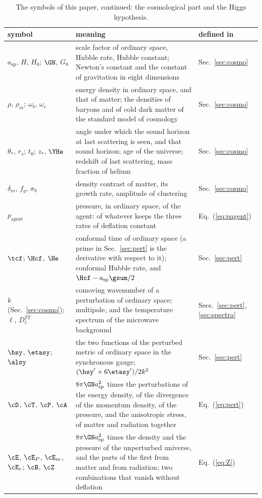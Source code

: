\begin{table}
\caption{\label{tab:symbols3}The symbols of this paper, continued: the cosmological part and the
Higgs hypothesis.}
\begin{ruledtabular}
\begin{tabular}{p{}p{}p{}}
symbol & meaning & defined in \\
\hline
$a_{\mathrm{sp}}$, $H$, $H_0$; $\GN$, $G_8$ & scale factor of ordinary space, Hubble rate, Hubble constant; Newton's constant and the constant of gravitation in eight dimensions & Sec.~\ref{sec:cosmo} \\
$\rho$, $\rho_m$; $\omega_b$, $\omega_c$ & energy density in ordinary space, and that of matter; the densities of baryons and of cold dark matter of the standard model of cosmology & Sec.~\ref{sec:cosmo} \\
$\theta_*$, $r_s$; $t_0$; $z_*$, $\YHe$ & angle under which the sound horizon at last scattering is seen, and that sound horizon; age of the universe; redshift of last scattering, mass fraction of helium & Sec.~\ref{sec:cosmo} \\
$\delta_m$, $f_g$, $\sigma_8$ & density contrast of matter, its growth rate, amplitude of clustering & Sec.~\ref{sec:cosmo} \\
$p_{\mathrm{agent}}$ & pressure, in ordinary space, of the agent: of whatever keeps the three rates of deflation constant & Eq.~(\ref{eq:pagent}) \\
$\tcf$; $\Hcf$, $\He$ & conformal time of ordinary space (a prime in Sec.~\ref{sec:pert} is the derivative with respect to it); conformal Hubble rate, and $\Hcf-a_{\mathrm{sp}}\gsum/2$ & Sec.~\ref{sec:pert} \\
$k$ (Sec.~\ref{sec:cosmo}); $\ell$, $D_\ell^{TT}$ & comoving wavenumber of a perturbation of ordinary space; multipole, and the temperature spectrum of the microwave background & Secs.~\ref{sec:pert}, \ref{sec:spectra} \\
$\hsy$, $\etasy$; $\alsy$ & the two functions of the perturbed metric of ordinary space in the synchronous gauge; $(\hsy'+6\etasy')/2k^{2}$ & Sec.~\ref{sec:pert} \\
$\cD$, $\cT$, $\cP$, $\cA$ & $8\pi\GN a_{\mathrm{sp}}^{2}$ times the perturbations of the energy density, of the divergence of the momentum density, of the pressure, and the anisotropic stress, of matter and radiation together & Eq.~(\ref{eq:pert}) \\
$\cE$, $\cE_P$, $\cE_m$, $\cE_r$; $\cB$, $\cZ$ & $8\pi\GN a_{\mathrm{sp}}^{2}$ times the density and the pressure of the unperturbed universe, and the parts of the first from matter and from radiation; two combinations that vanish without deflation & Eq.~(\ref{eq:Z}) \\

\end{tabular}
\end{ruledtabular}
\end{table}
